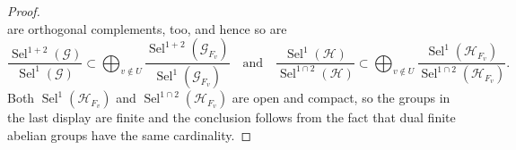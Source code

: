 \documentclass[11pt, reqno]{amsart}
\providecommand{\f}[2]{\frac{#1}{#2}}
\theoremstyle{plain}
\theoremstyle{remark}
\theoremstyle{definition}
\theoremstyle{subsection-tweak}
\numberwithin{equation}{subsection}
\begin{document}
\begin{proof}
\[\]
are orthogonal complements, too, and hence so are
\[
\textstyle{} \f{\operatorname{Sel}^{1 + 2}({\mathcal{G}})}{\operatorname{Sel}^1({\mathcal{G}})}  \subset \bigoplus_{v\not\in U} \f{\operatorname{Sel}^{1+ 2}({\mathcal{G}}_{F_v})}{\operatorname{Sel}^1({\mathcal{G}}_{F_v})}  \quad\text{and}\quad \f{\operatorname{Sel}^1({\mathcal{H}})}{\operatorname{Sel}^{1\cap 2}({\mathcal{H}})} \subset \bigoplus_{v\not\in U} \f{\operatorname{Sel}^1({\mathcal{H}}_{F_v})}{\operatorname{Sel}^{1 \cap 2}({\mathcal{H}}_{F_v})}.
\]
Both $\operatorname{Sel}^1({\mathcal{H}}_{F_v})$ and $\operatorname{Sel}^{1 \cap 2}({\mathcal{H}}_{F_v})$ are open and compact, so the groups in the last display are finite and the conclusion follows from the fact that dual finite abelian groups have the same cardinality.
\end{proof}
\end{document}
